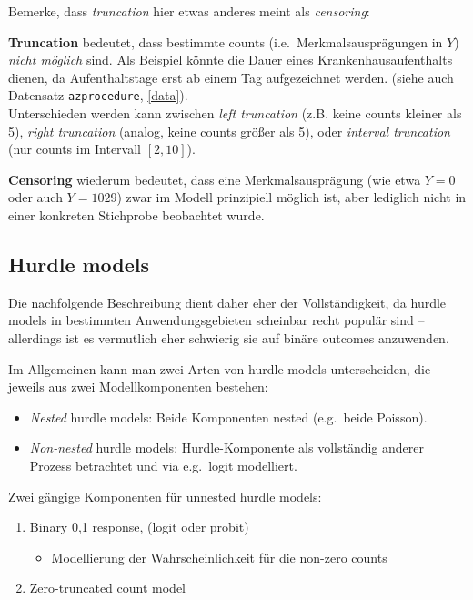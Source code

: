 \documentclass[ngerman,a4paper,]{scrartcl}
\providecommand{\tightlist}{%
  \setlength{\itemsep}{0pt}\setlength{\parskip}{0pt}}
\theoremstyle{definition}
\theoremstyle{definition}
\theoremstyle{definition}
\theoremstyle{remark}
\begin{document}
Bemerke, dass \emph{truncation} hier etwas anderes meint als \emph{censoring}:

\textbf{Truncation} bedeutet, dass bestimmte counts (i.e.~Merkmalsausprägungen in \(Y\)) \emph{nicht möglich} sind. Als Beispiel könnte die Dauer eines Krankenhausaufenthalts dienen, da Aufenthaltstage erst ab einem Tag aufgezeichnet werden. (siehe auch Datensatz \texttt{azprocedure}, \ref{data}).\\
Unterschieden werden kann zwischen \emph{left truncation} (z.B. keine counts kleiner als 5), \emph{right truncation} (analog, keine counts größer als 5), oder \emph{interval truncation} (nur counts im Intervall \([2, 10]\)).

\textbf{Censoring} wiederum bedeutet, dass eine Merkmalsausprägung (wie etwa \(Y = 0\) oder auch \(Y = 1029\)) zwar im Modell prinzipiell möglich ist, aber lediglich nicht in einer konkreten Stichprobe beobachtet wurde.

\hypertarget{mod-hurdle}{%
\subsection{Hurdle models}\label{mod-hurdle}}

Die nachfolgende Beschreibung dient daher eher der Vollständigkeit, da hurdle models in bestimmten Anwendungsgebieten scheinbar recht populär sind -- allerdings ist es vermutlich eher schwierig sie auf binäre outcomes anzuwenden.

Im Allgemeinen kann man zwei Arten von hurdle models unterscheiden, die jeweils aus zwei Modellkomponenten bestehen:

\begin{itemize}
\tightlist
\item
  \emph{Nested} hurdle models: Beide Komponenten nested (e.g.~beide Poisson).
\item
  \emph{Non-nested} hurdle models: Hurdle-Komponente als vollständig anderer Prozess betrachtet und via e.g.~logit modelliert.
\end{itemize}

Zwei gängige Komponenten für unnested hurdle models:

\begin{enumerate}
\def\labelenumi{\arabic{enumi}.}
\tightlist
\item
  Binary 0,1 response, (logit oder probit)

  \begin{itemize}
  \tightlist
  \item
    Modellierung der Wahrscheinlichkeit für die non-zero counts
  \end{itemize}
\item
  Zero-truncated count model
\end{enumerate}
\end{document}
